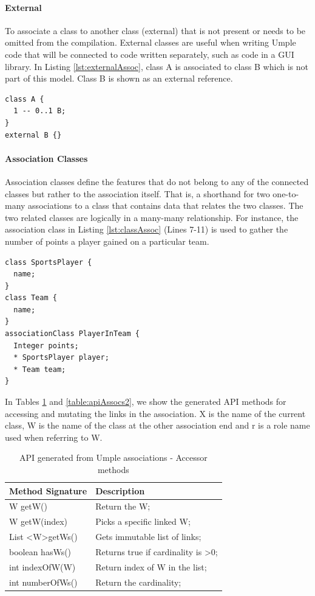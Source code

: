 \paragraph*{External}  
To associate a class to another class (external) that is not present or needs to be omitted from the compilation. External classes are useful when writing Umple code that will be connected to code written separately, such as code in a GUI library.
In Listing \ref{lst:externalAssoc}, class A is associated to class B which is not part of this model. Class B is shown as an external reference.
\begin{lstlisting}[style=umplePlainNumbers, caption=External associations,label=lst:externalAssoc]
class A {  
  1 -- 0..1 B; 
}  
external B {}
\end{lstlisting}

\paragraph*{Association Classes}
Association classes \cite{UMLSpec} define the features that do not belong to any of the connected classes but rather to the association itself. That is, a  shorthand for two one-to-many associations to a class that contains data that relates the two classes. The two related classes are logically in a many-many relationship. For instance, the association class in Listing \ref{lst:classAssoc} (Lines 7-11) is used to gather the number of points a player gained on a particular team. 
\begin{lstlisting}[style=umplePlainNumbers, caption=An association class,label=lst:classAssoc]
class SportsPlayer {
  name;
}
class Team {
  name;
}
associationClass PlayerInTeam {
  Integer points;
  * SportsPlayer player;
  * Team team;
}
\end{lstlisting}

In Tables \ref{table:apiAssocs1} and \ref{table:apiAssocs2}, we show the generated API methods for accessing and mutating the links in the association. X is the name of the current class, W is the name of the class at the other association end and r is a role name used when referring to W.

\begin{table}[h]
\centering
\caption{API generated from Umple associations - Accessor methods \cite{UmpleAPI}}
\label{table:apiAssocs1}
\begin{tabular}{l|l}
\toprule
\rowcolor[HTML]{BBDAFF}
\textbf{Method Signature} & \textbf{Description}     \\ \midrule
W getW() & Return the W;  \\ 
W getW(index) &	Picks a specific linked W;  \\ 
List \textless W\textgreater getWs() & Gets immutable list of links;  \\ 
boolean hasWs() & Returns true if cardinality is \textgreater  0; \\ 
int indexOfW(W)	 & Return index of W in the list;\\ 
int numberOfWs() & Return the cardinality; \\ 
\bottomrule
\end{tabular}
\end{table}

